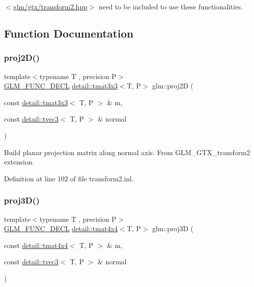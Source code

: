 $<$\hyperlink{transform2_8hpp}{glm/gtx/transform2.\+hpp}$>$ need to be included to use these functionalities. 

\subsection{Function Documentation}
\mbox{\label{group__gtx__transform2_gad51e1fa33875b966db2f97cb7f21c48a}} 
\subsubsection{\texorpdfstring{proj2\+D()}{proj2D()}}
{\footnotesize\ttfamily template$<$typename T , precision P$>$ \\
\hyperlink{setup_8hpp_ab2d052de21a70539923e9bcbf6e83a51}{G\+L\+M\+\_\+\+F\+U\+N\+C\+\_\+\+D\+E\+CL} \hyperlink{structglm_1_1detail_1_1tmat3x3}{detail\+::tmat3x3}$<$T, P$>$ glm\+::proj2D (\begin{DoxyParamCaption}\item[{const \hyperlink{structglm_1_1detail_1_1tmat3x3}{detail\+::tmat3x3}$<$ T, P $>$ \&}]{m,  }\item[{const \hyperlink{structglm_1_1detail_1_1tvec3}{detail\+::tvec3}$<$ T, P $>$ \&}]{normal }\end{DoxyParamCaption})}

Build planar projection matrix along normal axis. From G\+L\+M\+\_\+\+G\+T\+X\+\_\+transform2 extension. 

Definition at line 102 of file transform2.\+inl.

\mbox{\label{group__gtx__transform2_ga70a21b940727b94060fd3826eeacb048}} 
\subsubsection{\texorpdfstring{proj3\+D()}{proj3D()}}
{\footnotesize\ttfamily template$<$typename T , precision P$>$ \\
\hyperlink{setup_8hpp_ab2d052de21a70539923e9bcbf6e83a51}{G\+L\+M\+\_\+\+F\+U\+N\+C\+\_\+\+D\+E\+CL} \hyperlink{structglm_1_1detail_1_1tmat4x4}{detail\+::tmat4x4}$<$T, P$>$ glm\+::proj3D (\begin{DoxyParamCaption}\item[{const \hyperlink{structglm_1_1detail_1_1tmat4x4}{detail\+::tmat4x4}$<$ T, P $>$ \&}]{m,  }\item[{const \hyperlink{structglm_1_1detail_1_1tvec3}{detail\+::tvec3}$<$ T, P $>$ \&}]{normal }\end{DoxyParamCaption})}

